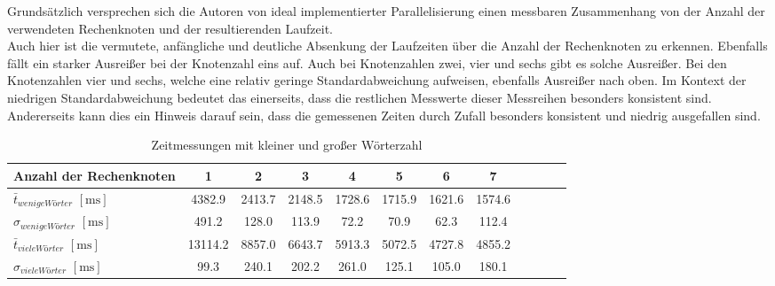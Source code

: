 Grundsätzlich versprechen sich die Autoren von ideal implementierter Parallelisierung einen messbaren Zusammenhang von der Anzahl der verwendeten Rechenknoten und der resultierenden Laufzeit.
\\
Auch hier ist die vermutete, anfängliche und deutliche 
Absenkung der Laufzeiten über die Anzahl der Rechenknoten zu erkennen. Ebenfalls fällt ein starker Ausreißer bei der Knotenzahl eins auf. Auch bei Knotenzahlen zwei, vier und sechs 
gibt es solche Ausreißer. Bei den Knotenzahlen vier und sechs, welche eine relativ geringe Standardabweichung aufweisen, ebenfalls Ausreißer nach oben. 
Im Kontext der niedrigen Standardabweichung bedeutet das einerseits, dass die restlichen Messwerte dieser Messreihen besonders konsistent sind. Andererseits kann dies ein Hinweis darauf sein, dass die gemessenen Zeiten durch Zufall besonders konsistent und niedrig ausgefallen sind.

\begin{table}
	\caption{Zeitmessungen mit kleiner und großer Wörterzahl}
	\label{zeiten_tabelle_lang_und_kurz}
	\begin{tabularx}{\textwidth}{@{}l*{10}{C}c@{}}
		\toprule
		Anzahl der Rechenknoten & 1 & 2 & 3 & 4 & 5 & 6 & 7 \\ 
		\midrule
		$\bar{t}_{wenige Wörter}$ $\mathrm{[ms]}$ & 4382.9 & 2413.7 & 2148.5 & 1728.6 & 1715.9 & 1621.6 & 1574.6 \\
		$\sigma_{wenige Wörter}$ $\mathrm{[ms]}$ & 491.2 & 128.0 & 113.9 & 72.2 & 70.9 & 62.3 & 112.4 \\
		\addlinespace
		$\bar{t}_{viele Wörter}$ $\mathrm{[ms]}$ & 13114.2 & 8857.0 & 6643.7 & 5913.3 & 5072.5 & 4727.8 & 4855.2 \\
		$\sigma_{viele Wörter}$ $\mathrm{[ms]}$ & 99.3 & 240.1 & 202.2 & 261.0 & 125.1 & 105.0 & 180.1 \\
		\bottomrule
	\end{tabularx}
\end{table}


